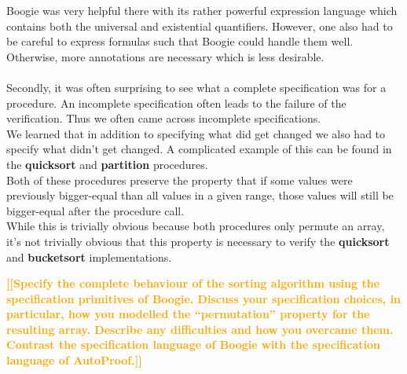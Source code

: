 \documentclass{report}
\newcommand{\todo}[1]{\textsf{\textbf{\textcolor{orange}{[[#1]]}}}}
\begin{document}
Boogie was very helpful there with its rather powerful expression language which
contains both the universal and existential quantifiers.
However, one also had to be careful to express formulas such that Boogie could
handle them well. Otherwise, more annotations are necessary which is less desirable.
\\
\\
Secondly, it was often surprising to see what a complete specification was for a procedure.
An incomplete specification often leads to the failure of the verification.
Thus we often came across incomplete specifications.\\
We learned that in addition to specifying what did get changed we also had to
specify what didn't get changed. A complicated example of this can be found in
the \textbf{quicksort} and \textbf{partition} procedures.\\
Both of these procedures preserve the property that if some values were previously
bigger-equal than all values in a given range, those values will still be bigger-equal
after the procedure call.\\
While this is trivially obvious because both procedures only permute an array,
it's not trivially obvious that this property is necessary to verify the
\textbf{quicksort} and \textbf{bucketsort} implementations.

\todo{Specify the complete behaviour of the sorting algorithm
using the specification primitives of Boogie. Discuss your specification choices, in
particular, how you modelled the “permutation” property for the resulting array.
Describe any difficulties and how you overcame them. Contrast the specification
language of Boogie with the specification language of AutoProof.}
\end{document}
